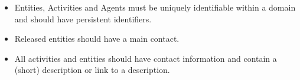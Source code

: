 


\begin{itemize}

\item Entities, Activities and Agents must be uniquely identifiable within a domain and should have persistent identifiers.

\item Released entities should have a main contact.

\item All activities and entities should have contact information and contain a (short) description or link to a description.

\end{itemize}


%

